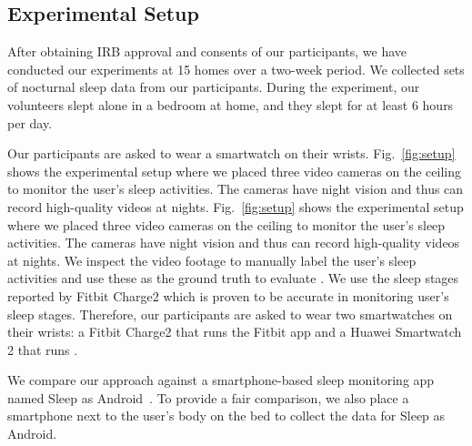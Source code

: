 \subsection{Experimental Setup}
After obtaining IRB approval and consents of our participants, we have conducted our experiments at 15 homes over a two-week period. We
collected  sets of nocturnal sleep data from our participants. During the experiment, our volunteers slept alone in a bedroom at
home, and they slept for at least 6 hours per day.


Our participants are asked to wear a smartwatch on their wrists. Fig.~\ref{fig:setup} shows the experimental setup where we placed three
video cameras on the ceiling to monitor the user's sleep activities. The cameras have night vision and thus can record high-quality videos
at nights.  Fig.~\ref{fig:setup} shows the experimental setup where we placed three video cameras on the ceiling to monitor the user's
sleep activities. The cameras have night vision and thus can record high-quality videos at nights. We inspect the video footage to manually
label the user's sleep activities and use these as the ground truth to evaluate \systemname. We use the sleep stages reported by Fitbit
Charge2 which is proven to be accurate in monitoring user's sleep stages\FIXME{~\cite{}}. Therefore, our participants are asked to wear two
smartwatches on their wrists: a Fitbit Charge2 that runs the Fitbit app and a Huawei Smartwatch 2 that runs \systemname.

We compare our approach against a smartphone-based sleep monitoring app named Sleep as Android~\cite{SleepAndroid}. To provide a fair
comparison, we also place a smartphone next to the user's body on the bed to collect the data for Sleep as Android.
